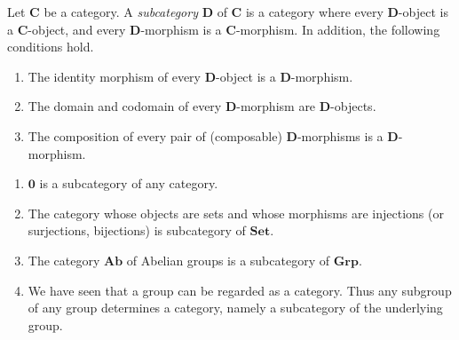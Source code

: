 \begin{definition}[Subcategories]
    Let \(\mathbf{C}\) be a category. 
    A \textit{subcategory} \(\mathbf{D}\) of \(\mathbf{C}\) is a category  where every  \(\mathbf{D}\)-object is a \(\mathbf{C}\)-object, and every  \(\mathbf{D}\)-morphism is a \(\mathbf{C}\)-morphism. In addition, the following conditions hold. 
    \begin{enumerate}[label=(\roman*)]
        \item The identity morphism of every \(\mathbf{D}\)-object is a \(\mathbf{D}\)-morphism.
        \item The domain and codomain of every \(\mathbf{D}\)-morphism are \(\mathbf{D}\)-objects.
        \item The composition of every pair of (composable) \(\mathbf{D}\)-morphisms is a \(\mathbf{D}\)-morphism.
    \end{enumerate}
    
\end{definition}

\begin{example}
\begin{enumerate}[label=(\alph*)]
    \item \(\mathbf{0}\) is a subcategory of any category.

    \item The category whose objects are sets and whose morphisms are injections (or surjections, bijections)   is subcategory of \(\mathbf{Set}\).    
    \item The category \(\mathbf{Ab}\) of Abelian groups is a subcategory of \(\mathbf{Grp}\).
    \item We have seen that a group can be regarded as a category. Thus any subgroup of any group determines a category, namely a subcategory of the underlying group.

\end{enumerate}
\end{example}

